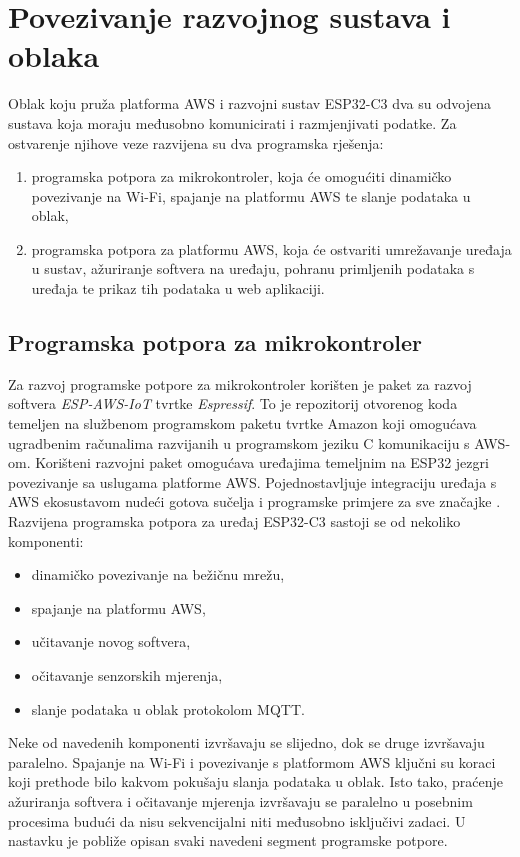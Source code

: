 \chapter{Povezivanje razvojnog sustava i oblaka}

Oblak koju pruža platforma AWS i razvojni sustav ESP32-C3 dva su odvojena sustava koja moraju međusobno komunicirati i razmjenjivati podatke. Za ostvarenje njihove veze razvijena su dva programska rješenja:
\begin{enumerate}
	\item programska potpora za mikrokontroler, koja će omogućiti dinamičko povezivanje na Wi-Fi, spajanje na platformu AWS te slanje podataka u oblak,
	\item programska potpora za platformu AWS, koja će ostvariti umrežavanje uređaja u sustav, ažuriranje softvera na uređaju, pohranu primljenih podataka s uređaja te prikaz tih podataka u web aplikaciji. 
\end{enumerate} 

\section{Programska potpora za mikrokontroler}

Za razvoj programske potpore za mikrokontroler korišten je paket za razvoj softvera \textit{ESP-AWS-IoT}  tvrtke \textit{Espressif}. To je repozitorij otvorenog koda temeljen na službenom programskom paketu tvrtke Amazon koji omogućava ugradbenim računalima razvijanih u programskom jeziku C komunikaciju s AWS-om. Korišteni razvojni paket omogućava uređajima temeljnim na ESP32 jezgri povezivanje sa uslugama platforme AWS. Pojednostavljuje integraciju uređaja s AWS ekosustavom nudeći gotova sučelja i programske primjere za sve značajke \cite{esp_aws_iot}. Razvijena programska potpora za uređaj ESP32-C3 sastoji se od nekoliko komponenti:
\begin{itemize}
	\item dinamičko povezivanje na bežičnu mrežu,
	\item spajanje na platformu AWS,
	\item učitavanje novog softvera, 
	\item očitavanje senzorskih mjerenja, 
	\item slanje podataka u oblak protokolom MQTT.
\end{itemize}

Neke od navedenih komponenti izvršavaju se slijedno, dok se druge izvršavaju paralelno. Spajanje na Wi-Fi i povezivanje s platformom AWS ključni su koraci koji prethode bilo kakvom pokušaju slanja podataka u oblak. Isto tako, praćenje ažuriranja softvera i očitavanje mjerenja izvršavaju se paralelno u posebnim procesima budući da nisu sekvencijalni niti međusobno isključivi zadaci. U nastavku je pobliže opisan svaki navedeni segment programske potpore. 

